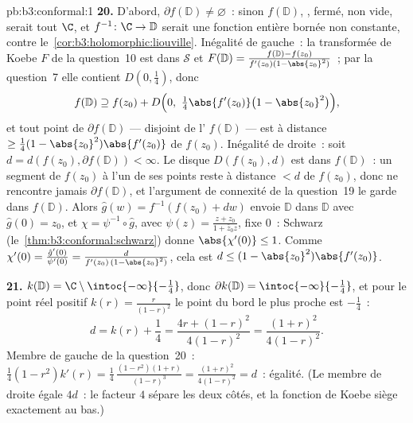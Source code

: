 \begin{solution}{pb:b3:conformal:1}
\textbf{20.} D'abord, $\partial f(\mathbb D) \neq
\varnothing$~: sinon $f(\mathbb D)$, , fermé, non
vide, serait tout $\C$, et $f^{-1} \colon \C \to \mathbb D$
serait une fonction entière bornée non constante, contre
le~\cref{cor:b3:holomorphic:liouville}. Inégalité de
gauche~: la transformée de Koebe $F$ de la question~10 est
dans $\mathcal S$ et $F(\mathbb D) = \frac{f(\mathbb D) -
f(z_0)}{f'(z_0)(1-\abs{z_0}^2)}$~; par la question~7 elle
contient $D(0, \frac14)$, donc
\[
f(\mathbb D) \supseteq f(z_0) + D\Bigl(0,\
\tfrac14\abs{f'(z_0)}\bigl(1 - \abs{z_0}^2\bigr)\Bigr) ,
\]
et tout point de $\partial f(\mathbb D)$ --- disjoint de
l' $f(\mathbb D)$ --- est à distance $\geq
\frac14(1-\abs{z_0}^2)\abs{f'(z_0)}$ de $f(z_0)$. Inégalité
de droite~: soit $d = d(f(z_0), \partial f(\mathbb D)) <
\infty$. Le disque $D(f(z_0), d)$ est dans $f(\mathbb D)$~:
un segment de $f(z_0)$ à l'un de ses points reste à
distance $< d$ de $f(z_0)$, donc ne rencontre jamais
$\partial f(\mathbb D)$, et l'argument de connexité de la
question~19 le garde dans $f(\mathbb D)$. Alors $\hat g(w)
= f^{-1}(f(z_0) + dw)$ envoie $\mathbb D$ dans $\mathbb D$
avec $\hat g(0) = z_0$, et $\chi = \psi^{-1}\circ\hat g$,
avec $\psi(z) = \frac{z + z_0}{1 + \bar z_0z}$, fixe $0$~:
Schwarz (le~\cref{thm:b3:conformal:schwarz}) donne
$\abs{\chi'(0)} \leq 1$. Comme $\chi'(0) =
\frac{\hat g'(0)}{\psi'(0)} =
\frac{d}{f'(z_0)\,(1 - \abs{z_0}^2)}$, cela est $d \leq (1
- \abs{z_0}^2)\abs{f'(z_0)}$.

\textbf{21.} $k(\mathbb D) = \C\setminus
\intoc{-\infty}{-\frac14}$, donc $\partial k(\mathbb D) =
\intoc{-\infty}{-\frac14}$, et pour le point réel positif
$k(r) = \frac r{(1-r)^2}$ le point du bord le plus proche
est $-\frac14$~:
\[
d = k(r) + \frac14 = \frac{4r + (1-r)^2}{4(1-r)^2}
= \frac{(1+r)^2}{4(1-r)^2} .
\]
Membre de gauche de la question~20~: $\frac14(1 -
r^2)k'(r) = \frac14\,\frac{(1-r^2)(1+r)}{(1-r)^3} =
\frac{(1+r)^2}{4(1-r)^2} = d$~: égalité. (Le membre de
droite égale $4d$~: le facteur $4$ sépare les deux côtés, et
la fonction de Koebe siège exactement au bas.)


\end{solution}
